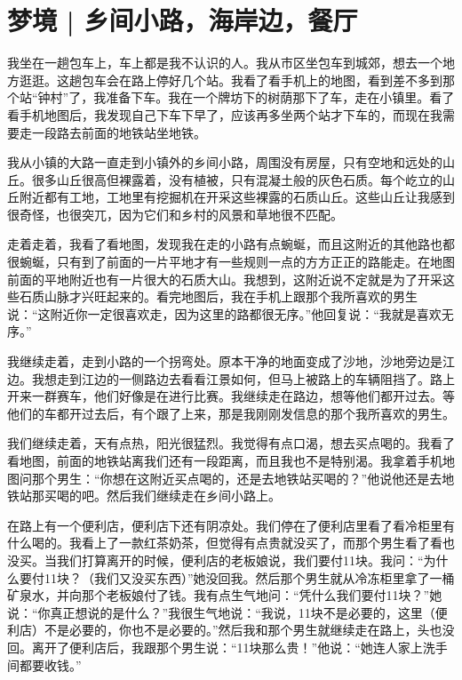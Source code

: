 \chapter{梦境 | 乡间小路，海岸边，餐厅}



我坐在一趟包车上，车上都是我不认识的人。我从市区坐包车到城郊，想去一个地方逛逛。这趟包车会在路上停好几个站。我看了看手机上的地图，看到差不多到那个站“钟村”了，我准备下车。我在一个牌坊下的树荫那下了车，走在小镇里。看了看手机地图后，我发现自己下车下早了，应该再多坐两个站才下车的，而现在我需要走一段路去前面的地铁站坐地铁。

我从小镇的大路一直走到小镇外的乡间小路，周围没有房屋，只有空地和远处的山丘。很多山丘很高但裸露着，没有植被，只有混凝土般的灰色石质。每个屹立的山丘附近都有工地，工地里有挖掘机在开采这些裸露的石质山丘。这些山丘让我感到很奇怪，也很突兀，因为它们和乡村的风景和草地很不匹配。

走着走着，我看了看地图，发现我在走的小路有点蜿蜒，而且这附近的其他路也都很蜿蜒，只有到了前面的一片平地才有一些规则一点的方方正正的路能走。在地图前面的平地附近也有一片很大的石质大山。我想到，这附近说不定就是为了开采这些石质山脉才兴旺起来的。看完地图后，我在手机上跟那个我所喜欢的男生说：“这附近你一定很喜欢走，因为这里的路都很无序。”他回复说：“我就是喜欢无序。”

我继续走着，走到小路的一个拐弯处。原本干净的地面变成了沙地，沙地旁边是江边。我想走到江边的一侧路边去看看江景如何，但马上被路上的车辆阻挡了。路上开来一群赛车，他们好像是在进行比赛。我继续走在路边，想等他们都开过去。等他们的车都开过去后，有个跟了上来，那是我刚刚发信息的那个我所喜欢的男生。

我们继续走着，天有点热，阳光很猛烈。我觉得有点口渴，想去买点喝的。我看了看地图，前面的地铁站离我们还有一段距离，而且我也不是特别渴。我拿着手机地图问那个男生：“你想在这附近买点喝的，还是去地铁站买喝的？”他说他还是去地铁站那买喝的吧。然后我们继续走在乡间小路上。

在路上有一个便利店，便利店下还有阴凉处。我们停在了便利店里看了看冷柜里有什么喝的。我看上了一款红茶奶茶，但觉得有点贵就没买了，而那个男生看了看也没买。当我们打算离开的时候，便利店的老板娘说，我们要付11块。我问：“为什么要付11块？（我们又没买东西）”她没回我。然后那个男生就从冷冻柜里拿了一桶矿泉水，并向那个老板娘付了钱。我有点生气地问：“凭什么我们要付11块？”她说：“你真正想说的是什么？”我很生气地说：“我说，11块不是必要的，这里（便利店）不是必要的，你也不是必要的。”然后我和那个男生就继续走在路上，头也没回。离开了便利店后，我跟那个男生说：“11块那么贵！”他说：“她连人家上洗手间都要收钱。”

